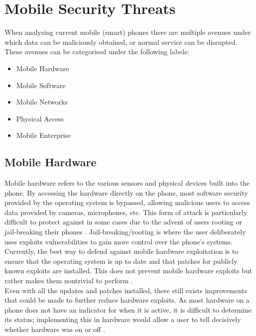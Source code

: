 
\section{Mobile Security Threats}

\label{Ch2 Sec2}

When analysing current mobile (smart) phones there are multiple avenues under which data can be maliciously obtained, or normal service can be disrupted.
These avenues can be categorised under the following labels:
\begin{itemize} 
\item Mobile Hardware
\item Mobile Software
\item Mobile Networks
\item Physical Access
\item Mobile Enterprise 
\end{itemize}


\subsection{Mobile Hardware}

\label{Ch2 Sec2 Sub1}

Mobile hardware refers to the various sensors and physical devices built into the phone.
By accessing the hardware directly on the phone, most software security provided by the operating system is bypassed, allowing malicious users to access data provided by cameras, microphones, etc.
This form of attack is particularly difficult to protect against in some cases due to the advent of users rooting or jail-breaking their phones \cite{Reference11}.
Jail-breaking/rooting is where the user deliberately uses exploits vulnerabilities to gain more control over the phone’s systems.\\
Currently, the best way to defend against mobile hardware exploitation is to ensure that the operating system is up to date and that patches for publicly known exploits are installed.
This does not prevent mobile hardware exploits but rather makes them nontrivial to perform \cite{Reference12}.\\
Even with all the updates and patches installed, there still exists improvements that could be made to further reduce hardware exploits.
As most hardware on a phone does not have an indicator for when it is active, it is difficult to determine its status; implementing this in hardware would allow a user to tell decisively whether hardware was on or off \cite{Reference13}.

